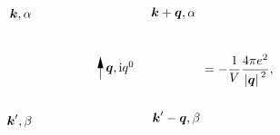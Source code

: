 \begin{equation}
\begin{gathered}
\begin{tikzpicture}[x=0.75pt,y=0.75pt,yscale=-1,xscale=1]
            \draw    (169.09,129.1) -- (169.09,107.04) ;
            \draw [shift={(169.09,105.04)}, rotate = 450] [fill={rgb, 255:red, 0; green, 0; blue, 0 }  ][line width=0.08]  [draw opacity=0] (12,-3) -- (0,0) -- (12,3) -- cycle    ;
            
            \draw (97.72,60.8) node [anchor=east] [inner sep=0.75pt]    {$\boldsymbol{k} ,\alpha $};
            \draw (221.22,59.47) node [anchor=west] [inner sep=0.75pt]    {$\boldsymbol{k} +\boldsymbol{q} ,\alpha $};
            \draw (173.48,108.5) node [anchor=north west][inner sep=0.75pt]    {$\boldsymbol{q}, \ii q^0$};
            \draw (98.17,172.51) node [anchor=east] [inner sep=0.75pt]    {$\boldsymbol{k} ',\beta $};
            \draw (222.46,169.26) node [anchor=west] [inner sep=0.75pt]    {$\boldsymbol{k} '-\boldsymbol{q} ,\beta $};
            \end{tikzpicture}
    \end{gathered} = - \frac{1}{V} \frac{4\pi e^2}{\abs*{\vb*{q}}^2},
\end{equation}